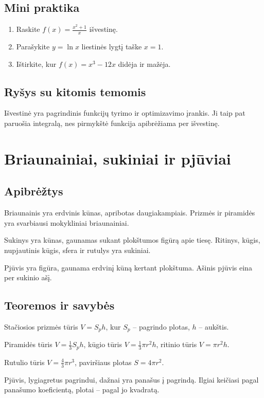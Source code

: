 \subsection{Mini praktika}
\begin{enumerate}[label=\alph*)]
\item Raskite \(f(x)=\frac{x^2+1}{x}\) išvestinę.
\item Parašykite \(y=\ln x\) liestinės lygtį taške \(x=1\).
\item Ištirkite, kur \(f(x)=x^3-12x\) didėja ir mažėja.
\end{enumerate}

\subsection{Ryšys su kitomis temomis}
Išvestinė yra pagrindinis funkcijų tyrimo ir optimizavimo įrankis. Ji taip pat paruošia integralą, nes pirmykštė funkcija apibrėžiama per išvestinę.

\section{Briaunainiai, sukiniai ir pjūviai}\label{sec:briaunainiai-sukiniai-ir-pjuviai}

\subsection{Apibrėžtys}
\begin{apibreztis}
Briaunainis yra erdvinis kūnas, apribotas daugiakampiais. Prizmės ir piramidės yra svarbiausi mokykliniai briaunainiai.
\end{apibreztis}
\begin{apibreztis}
Sukinys yra kūnas, gaunamas sukant plokštumos figūrą apie tiesę. Ritinys, kūgis, nupjautinis kūgis, sfera ir rutulys yra sukiniai.
\end{apibreztis}
\begin{apibreztis}
Pjūvis yra figūra, gaunama erdvinį kūną kertant plokštuma. Ašinis pjūvis eina per sukinio ašį.
\end{apibreztis}

\subsection{Teoremos ir savybės}
\begin{savybe}
Stačiosios prizmės tūris \(V=S_p h\), kur \(S_p\) -- pagrindo plotas, \(h\) -- aukštis.
\end{savybe}
\begin{savybe}
Piramidės tūris \(V=\frac13 S_p h\), kūgio tūris \(V=\frac13\pi r^2h\), ritinio tūris \(V=\pi r^2h\).
\end{savybe}
\begin{savybe}
Rutulio tūris \(V=\frac43\pi r^3\), paviršiaus plotas \(S=4\pi r^2\).
\end{savybe}
\begin{savybe}
Pjūvis, lygiagretus pagrindui, dažnai yra panašus į pagrindą. Ilgiai keičiasi pagal panašumo koeficientą, plotai -- pagal jo kvadratą.
\end{savybe}

